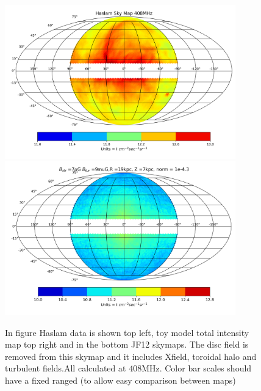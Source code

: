\documentclass[12pt, a4 paper]{article}
\newcommand{\Andrew}[1]{\textcolor{dg}{#1}}
\begin{document}
\begin{figure}[h!]
    \centering
    \includegraphics[width = 10cm]{Images/Haslam_408MHz.png}
    \includegraphics[width =
    10cm]{Images/408MHz_TI_Spec_Ind_3.0_Bstr_7_Btur_9_R_19_Z_7_norm_4.3.png}
    \caption{In figure Haslam data is shown top left, toy model total intensity map top right and in the bottom JF12 skymaps. The disc field is removed from this skymap and it includes Xfield, toroidal halo and turbulent fields.All calculated at $408$MHz. \Andrew{Color bar scales should have a fixed ranged (to allow easy comparison between maps)}}
    \label{fig:my_label}
\end{figure}
\newpage

\fi
\end{document}

